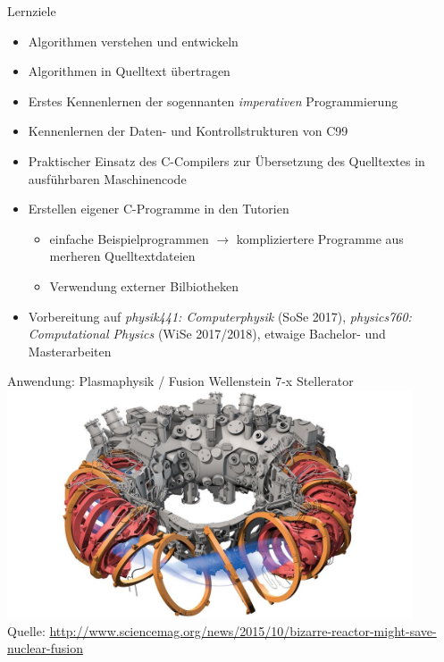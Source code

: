 \documentclass[xcolor=dvipsnames]{beamer}
\begin{document}
\begin{frame}{Lernziele}
\begin{itemize}
  \item{Algorithmen verstehen und entwickeln}
  \item{Algorithmen in Quelltext übertragen}
  \vspace{0.3cm}
  \item{Erstes Kennenlernen der sogennanten \emph{imperativen} Programmierung}
  \item{Kennenlernen der Daten- und Kontrollstrukturen von C99}
  \vspace{0.3cm}
  \item{Praktischer Einsatz des C-Compilers zur Übersetzung des Quelltextes in ausführbaren Maschinencode}
  \item{Erstellen eigener C-Programme in den Tutorien}
  \begin{itemize}
    \item{einfache Beispielprogrammen $\rightarrow$ kompliziertere Programme aus merheren Quelltextdateien}
    \item{Verwendung externer Bilbiotheken}
  \end{itemize}
  \vspace{0.3cm}
  \item{Vorbereitung auf \emph{physik441: Computerphysik} (SoSe 2017), \emph{physics760: Computational Physics} (WiSe 2017/2018), etwaige Bachelor- und Masterarbeiten}
\end{itemize} 
\end{frame}

\begin{frame}{Anwendung: Plasmaphysik / Fusion}
  \centering
  Wellenstein 7-x Stellerator\\ \vspace{0.2cm}
  \includegraphics[width=0.9\textwidth]{graphics/stellerator.jpg}\\
  {\small Quelle: \url{http://www.sciencemag.org/news/2015/10/bizarre-reactor-might-save-nuclear-fusion} }
\end{frame}
\end{document}
